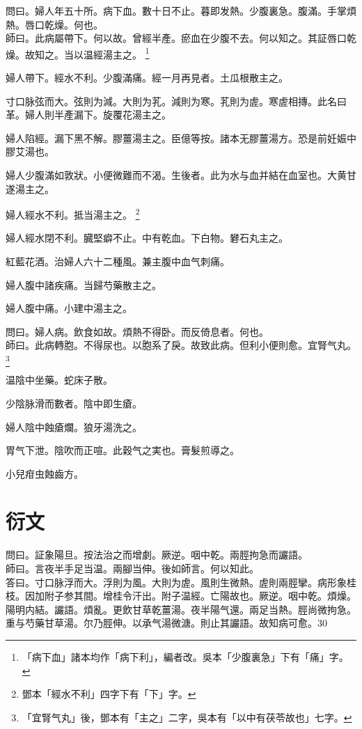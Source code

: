 問曰。婦人年五十所。病下血。數十日不止。暮即发熱。少腹裏急。腹滿。手掌煩熱。唇口乾燥。何也。\\
師曰。此病屬帶下。何以故。曾經半產。瘀血在少腹不去。何以知之。其証唇口乾燥。故知之。当以温經湯主之。
	\footnote{
		「病下血」諸本均作「病下利」，編者改。吳本「少腹裏急」下有「痛」字。
	}

{\khaaitp 婦人}帶下。經水不利。少腹滿痛。經一月再見者。土瓜根散主之。

寸口脉弦而大。弦則为減。大則为芤。減則为寒。芤則为虗。寒虗相摶。此名曰革。婦人則半產漏下。旋覆花湯主之。

婦人陷經。漏下黑不解。膠薑湯主之。{\scriptsize 臣億等按。諸本无膠薑湯{\khaaitp 方}。恐是前妊娠中膠艾湯也。}

婦人少腹滿如敦狀。小便微難而不渴。生後者。此为水与血并結在血室也。大黄甘遂湯主之。

婦人經水不利。抵当湯主之。
	\footnote{鄧本「經水不利」四字下有「下」字。}

婦人經水閉不利。臓堅癖不止。中有乾血。下白物。礬石丸主之。

紅藍花酒。治婦人六十二種風。兼主腹中血气刺痛。

婦人腹中諸疾痛。当歸芍藥散主之。

婦人腹中痛。小建中湯主之。

問曰。婦人病。飲食如故。煩熱不得卧。而反倚息者。何也。\\
師曰。此病轉胞。不得尿也。以胞系了戾。故致此病。但利小便則愈。宜腎气丸。
	\footnote{「宜腎气丸」後，鄧本有「主之」二字，吳本有「以中有茯苓故也」七字。}

温陰中坐藥。蛇床子散。

少陰脉滑而數者。陰中即生瘡。

{\khaaitp 婦人}陰中蝕瘡爛。狼牙湯洗之。

胃气下泄。陰吹而正喧。此穀气之実也。膏髮煎導之。

小兒疳虫蝕齒方。


\part{衍文}

問曰。証象陽旦。按法治之而增劇。厥逆。咽中乾。兩脛拘急而讝語。\\
師曰。言夜半手足当温。兩腳当伸。後如師言。何以知此。\\
答曰。寸口脉浮而大。浮{\khaaitp 則}为風。大{\khaaitp 則}为虗。風則生微熱。虗則兩脛攣。病形象桂枝。因加附子参其間。增桂令汗出。附子温經。亡陽故也。厥逆。咽中乾。煩燥。陽明内結。讝語。煩亂。更飲甘草乾薑湯。夜半陽气還。兩足当熱。脛尚微拘急。重与芍藥甘草湯。尔乃脛伸。以承气湯微溏。則止其讝語。故知病可愈。30

